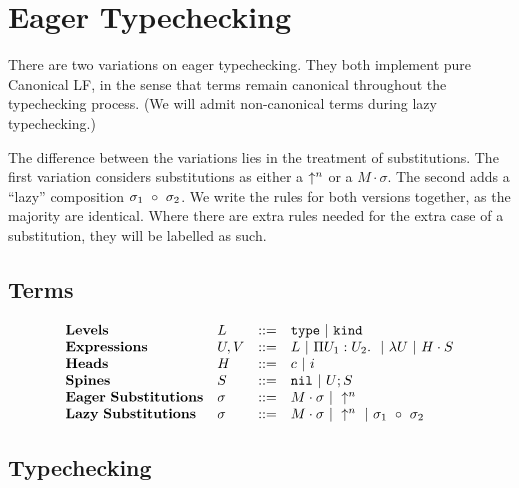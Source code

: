 


\section{Eager Typechecking}

There are two variations on eager typechecking. 
They both implement pure Canonical LF, in the sense that
terms remain canonical throughout the typechecking process.
(We will admit non-canonical terms during lazy typechecking.)

The difference between the variations lies in the treatment
of substitutions. The first variation
considers substitutions as either a $\uparrow^n$ or a $M\cdot\sigma$.
The second adds a ``lazy'' composition $\sigma_1~\circ~\sigma_2$.
We write the rules for both versions together, as the majority
are identical.  Where there are extra rules needed for the
extra case of a substitution, they will be labelled as such.


\subsection{Terms}

$$
\begin{array}{llll}
\mathbf{Levels} & L & ::= & \mathtt{type} \ |\  \mathtt{kind} \\
\mathbf{Expressions} & U,V & ::= & L \ |\  \Pi U_1 : U_2.\ \ |\  \lambda U \ |\  H\cdot S \\
\mathbf{Heads} & H & ::= & c \ |\  i\\
\mathbf{Spines} & S & ::= & \mathtt{nil} \ |\  U;S\\
\mathbf{Eager\ Substitutions} & \sigma & ::= & M\cdot\sigma \ |\  \uparrow^n \\
\mathbf{Lazy\ Substitutions} & \sigma & ::= & M\cdot\sigma \ |\  \uparrow^n \ |\  \sigma_1 ~\circ~ \sigma_2\\
\end{array} 
$$



\subsection{Typechecking}

